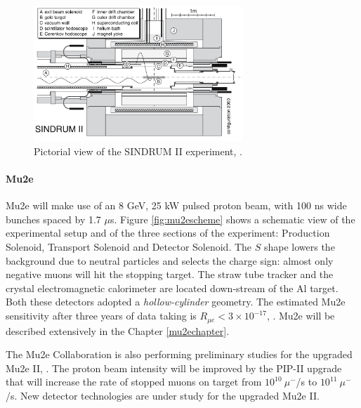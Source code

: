 \begin{figure}[!h]
\centering
\includegraphics[width =0.7\textwidth]{figures/png/Screenshot_20240307_163120.png}
\caption[SINDRUM II experiment.]{Pictorial view of the SINDRUM II experiment, \cite{SINDRUMII:2006dvw}.}
\label{fig:sindrumii}
\end{figure}
\paragraph{Mu2e}
Mu2e will make use of an 8 GeV, 
25 kW pulsed proton beam, with 100 
ns wide bunches spaced by 1.7 $\mu$s. 
Figure \ref{fig:mu2escheme} shows a 
schematic view of the experimental setup and of the
three sections of the experiment: 
Production Solenoid, Transport
Solenoid and Detector Solenoid. The 
$S$ shape lowers the background due to 
neutral particles and selects the 
charge sign: almost only negative 
muons will hit the stopping target. 
The straw tube tracker and the crystal 
electromagnetic calorimeter are located 
down-stream of the Al target. 
Both these detectors adopted a 
\textit{hollow-cylinder} geometry. 
The estimated Mu2e sensitivity after 
three years of data taking is 
$R_{\mu e} < 3 \times 10^{-17}$, 
\cite{universe9010054}.
Mu2e will be described 
extensively in the Chapter \ref{mu2echapter}.

The Mu2e Collaboration is also 
performing preliminary studies for 
the upgraded Mu2e II, \cite{dukes}. 
The proton beam intensity will be 
improved by the PIP-II upgrade that 
will increase the rate of stopped muons 
on target from $10^{10} \ \mu^-$/s 
to $10^{11} \ \mu^-$/s. New detector 
technologies are under study for the upgraded
Mu2e II.
